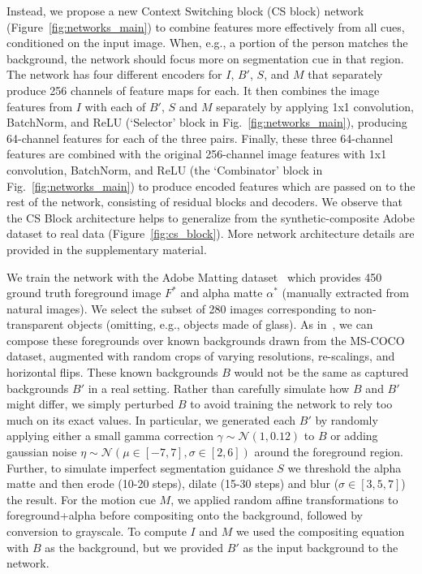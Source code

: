 \documentclass[10pt,twocolumn,letterpaper]{article}
\begin{document}
Instead, we propose a new Context Switching block (CS block) network (Figure~\ref{fig:networks_main}) to combine features more effectively from all cues, conditioned on the input image. When, e.g., a portion of the person matches the background, the network should focus more on  segmentation cue in that region. The network has four different encoders for $I$, $B'$, $S$, and $M$ that separately produce 256 channels of feature maps for each. It then combines the image features from $I$ with each of $B'$, $S$ and $M$ separately by applying 1x1 convolution, BatchNorm, and ReLU (`Selector' block in Fig.~\ref{fig:networks_main}), producing 64-channel features for each of the three pairs. Finally, these three 64-channel features are combined with the original 256-channel image features with 1x1 convolution, BatchNorm, and ReLU (the `Combinator' block in Fig.~\ref{fig:networks_main}) to produce encoded features which are passed on to the rest of the network, consisting of residual blocks and decoders. We observe that the CS Block architecture helps to generalize from the synthetic-composite Adobe dataset to real data (Figure~\ref{fig:cs_block}). More network architecture details are provided in the supplementary material.










We train the network with the Adobe Matting dataset~\cite{xu2017deep} which provides 450 ground truth foreground image $F^*$ and alpha matte $\alpha^*$ (manually extracted from natural images).  We select the subset of 280 images corresponding to non-transparent objects (omitting, e.g., objects made of glass).  As in~\cite{xu2017deep}, we can compose these foregrounds over known backgrounds drawn from the MS-COCO dataset, augmented with random crops of varying resolutions, re-scalings, and horizontal flips.  These known backgrounds $B$ would not be the same as captured backgrounds $B'$ in a real setting.  Rather than carefully simulate how $B$ and $B'$ might differ, we simply perturbed $B$ to avoid training the network to rely too much on its exact values.  In particular, we generated each $B'$ by randomly applying either a small gamma correction $\gamma \sim \mathcal{N}(1,0.12)$ to $B$ or adding gaussian noise $\eta \sim \mathcal{N}(\mu \in [-7,7],\sigma \in [2,6])$ around the foreground region. Further, to simulate imperfect segmentation guidance $S$ we threshold the alpha matte and then erode (10-20 steps), dilate (15-30 steps) and blur ($\sigma \in [3,5,7]$) the result. For the motion cue $M$, we applied random affine transformations to foreground+alpha before compositing onto the background, followed by conversion to grayscale.  To compute $I$ and $M$ we used the compositing equation with $B$ as the background, but we provided $B'$ as the input background to the network.
\end{document}
